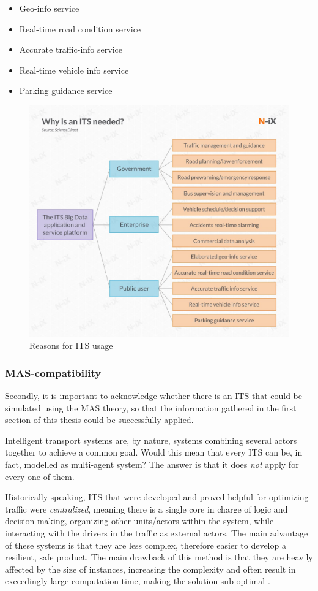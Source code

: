 \documentclass[main.tex]{subfiles}
\begin{document}
\begin{itemize}
    \item Geo-info service
    \item Real-time road condition service 
    \item Accurate traffic-info service 
    \item Real-time vehicle info service 
    \item Parking guidance service
\end{itemize}

\begin{figure}[htbp]
    \centering
    \includegraphics[width=.8\textwidth]{why is ITS needed.jpg}
    \caption{Reasons for ITS usage}
    \label{whyITS}
\end{figure}

\subsubsection{MAS-compatibility} \label{mas-compatibility}

Secondly, it is important to acknowledge whether there is an ITS that could be simulated using the MAS theory,
so that the information gathered in the first section of this thesis could be successfully applied.

Intelligent transport systems are, by nature, systems combining several actors together to achieve a common goal. 
Would this mean that every ITS can be, in fact, modelled as multi-agent system? The answer is
that it does \emph{not} apply for every one of them. 

Historically speaking, ITS that were
developed and proved helpful for optimizing traffic were \emph{centralized}, meaning there is a
single core in charge of logic and decision-making, organizing other units/actors within the
system, while interacting with the drivers in the traffic as external actors. The main
advantage of these systems is that they are less complex, therefore easier to develop a resilient,
safe product. The main drawback of this method is that they are heavily affected by the size
of instances, increasing the complexity and often result in exceedingly large computation time,
making the solution sub-optimal \cite{Corman2010}. 
\end{document}
